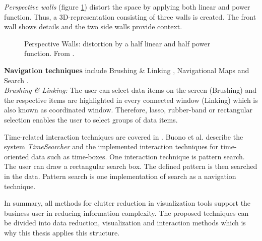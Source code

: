 \textit{Perspective walls} (figure \ref{fig:perspectivewall}) distort the space by applying both linear and power function. Thus, a 3D-representation consisting of three walls is created. The front wall shows details and the two side walls provide context. 
\begin{figure}[H]
    \centering
    \caption[Perspective Walls]{Perspective Walls: distortion by a half linear and half power function. From  \cite{Stroe1999}.}
    \label{fig:perspectivewall}
\end{figure} 
\par
\textbf{Navigation techniques }include Brushing \& Linking \cite{Tegarden1999, Aigner2011}, Navigational Maps \cite{Keim2005} and Search \cite{Buono2005}. \\
\textit{Brushing \& Linking: }The user can select data items on the screen (Brushing) and the respective items are highlighted in every connected window (Linking) which is also known as coordinated window. Therefore, lasso, rubber-band or rectangular selection enables the user to select groups of data items. 
\par
Time-related interaction techniques are covered in \cite{Buono2005}. Buono et al. describe the system \textit{TimeSearcher} and the implemented interaction techniques for time-oriented data such as time-boxes. One interaction technique is pattern search. The user can draw a rectangular search box. The defined pattern is then searched in the data. Pattern search is one implementation of search as a navigation technique.\\
\par
In summary, all methods for clutter reduction in visualization tools support the business user in reducing information complexity. The proposed techniques can be divided into data reduction, visualization and interaction methods which is why this thesis applies this structure.
\par
